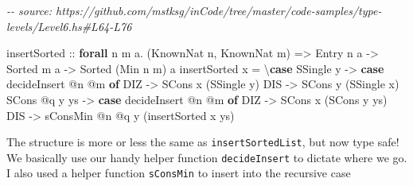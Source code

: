 \documentclass[]{article}
\newenvironment{Shaded}{}{}
\newcommand{\CommentTok}[1]{\textcolor[rgb]{0.38,0.63,0.69}{\textit{#1}}}
\newcommand{\DataTypeTok}[1]{\textcolor[rgb]{0.56,0.13,0.00}{#1}}
\newcommand{\KeywordTok}[1]{\textcolor[rgb]{0.00,0.44,0.13}{\textbf{#1}}}
\newcommand{\NormalTok}[1]{#1}
\newcommand{\OperatorTok}[1]{\textcolor[rgb]{0.40,0.40,0.40}{#1}}
\newcommand{\OtherTok}[1]{\textcolor[rgb]{0.00,0.44,0.13}{#1}}
\begin{document}
\begin{Shaded}
\begin{Highlighting}[]
\CommentTok{{-}{-} source: https://github.com/mstksg/inCode/tree/master/code{-}samples/type{-}levels/Level6.hs\#L64{-}L76}

\OtherTok{insertSorted ::}
  \KeywordTok{forall}\NormalTok{ n m a}\OperatorTok{.}
\NormalTok{  (}\DataTypeTok{KnownNat}\NormalTok{ n, }\DataTypeTok{KnownNat}\NormalTok{ m) }\OtherTok{=\textgreater{}}
  \DataTypeTok{Entry}\NormalTok{ n a }\OtherTok{{-}\textgreater{}}
  \DataTypeTok{Sorted}\NormalTok{ m a }\OtherTok{{-}\textgreater{}}
  \DataTypeTok{Sorted}\NormalTok{ (}\DataTypeTok{Min}\NormalTok{ n m) a}
\NormalTok{insertSorted x }\OtherTok{=}\NormalTok{ \textbackslash{}}\KeywordTok{case}
  \DataTypeTok{SSingle}\NormalTok{ y }\OtherTok{{-}\textgreater{}} \KeywordTok{case}\NormalTok{ decideInsert }\OperatorTok{@}\NormalTok{n }\OperatorTok{@}\NormalTok{m }\KeywordTok{of}
    \DataTypeTok{DIZ} \OtherTok{{-}\textgreater{}} \DataTypeTok{SCons}\NormalTok{ x (}\DataTypeTok{SSingle}\NormalTok{ y)}
    \DataTypeTok{DIS} \OtherTok{{-}\textgreater{}} \DataTypeTok{SCons}\NormalTok{ y (}\DataTypeTok{SSingle}\NormalTok{ x)}
  \DataTypeTok{SCons} \OperatorTok{@}\NormalTok{q y ys }\OtherTok{{-}\textgreater{}} \KeywordTok{case}\NormalTok{ decideInsert }\OperatorTok{@}\NormalTok{n }\OperatorTok{@}\NormalTok{m }\KeywordTok{of}
    \DataTypeTok{DIZ} \OtherTok{{-}\textgreater{}} \DataTypeTok{SCons}\NormalTok{ x (}\DataTypeTok{SCons}\NormalTok{ y ys)}
    \DataTypeTok{DIS} \OtherTok{{-}\textgreater{}}\NormalTok{ sConsMin }\OperatorTok{@}\NormalTok{n }\OperatorTok{@}\NormalTok{q y (insertSorted x ys)}
\end{Highlighting}
\end{Shaded}

The structure is more or less the same as \texttt{insertSortedList}, but now
type safe! We basically use our handy helper function \texttt{decideInsert} to
dictate where we go. I also used a helper function \texttt{sConsMin} to insert
into the recursive case
\end{document}
